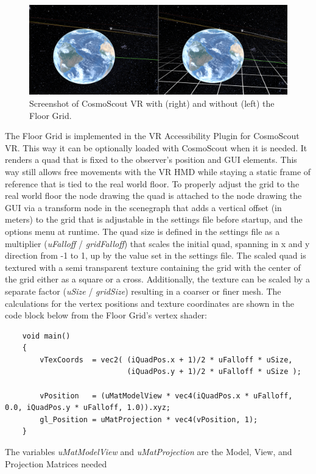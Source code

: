 \begin{figure}[h]
    \centering
    \includegraphics[width=\textwidth]{content/4_1_floorGrid/img/FloorGrid_Screenshot}
    \caption{Screenshot of CosmoScout VR with (right) and without (left) the Floor Grid.}
    \label{fig:floor-grid-screenshot}
\end{figure}
The Floor Grid is implemented in the VR Accessibility Plugin for CosmoScout VR.
This way it can be optionally loaded with CosmoScout when it is needed.
It renders a quad that is fixed to the observer's position and GUI elements.
This way still allows free movements with the VR HMD while staying a static frame of reference that is tied to
the real world floor.
To properly adjust the grid to the real world floor the node drawing the quad is attached to the node drawing the GUI
via a transform node in the scenegraph that adds a vertical offset (in meters) to the grid that is adjustable in the
settings file before startup, and the options menu at runtime.
The quad size is defined in the settings file as a multiplier (\textit{uFalloff} / \textit{gridFalloff}) that scales
the initial quad, spanning in x and y direction from -1 to 1, up by the value set in the settings file.
The scaled quad is textured with a semi transparent texture containing the grid with the center of the grid either as a
square or a cross.
Additionally, the texture can be scaled by a separate factor (\textit{uSize} / \textit{gridSize}) resulting in a
coarser or finer mesh.
The calculations for the vertex positions and texture coordinates are shown in the code block below from the Floor
Grid's vertex shader:
\begin{verbatim}
    void main()
    {
        vTexCoords  = vec2( (iQuadPos.x + 1)/2 * uFalloff * uSize,
                            (iQuadPos.y + 1)/2 * uFalloff * uSize );

        vPosition   = (uMatModelView * vec4(iQuadPos.x * uFalloff, 0.0, iQuadPos.y * uFalloff, 1.0)).xyz;
        gl_Position = uMatProjection * vec4(vPosition, 1);
    }
\end{verbatim}
The variables \textit{uMatModelView} and \textit{uMatProjection} are the Model, View, and Projection Matrices needed
